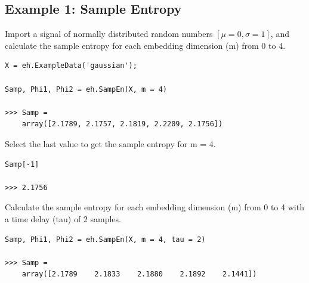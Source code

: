 \documentclass[12pt, a4paper, titlepage, openany]{book}
\begin{document}
\subsection{\normalsize Example 1: \hspace{15mm} Sample Entropy}
\noindent Import a signal of normally distributed random numbers $[\mu = 0, \sigma = 1]$, and calculate the sample entropy for each embedding dimension (m) from 0 to 4.
\begin{verbatim}
X = eh.ExampleData('gaussian');

Samp, Phi1, Phi2 = eh.SampEn(X, m = 4)

>>> Samp = 
    array([2.1789, 2.1757, 2.1819, 2.2209, 2.1756])
\end{verbatim}
Select the last value to get the sample entropy for m = 4.
\begin{verbatim}
Samp[-1]

>>> 2.1756
\end{verbatim}
Calculate the sample entropy for each embedding dimension (m) from 0 to 4 with a time delay (tau) of 2 samples.
\begin{verbatim}
Samp, Phi1, Phi2 = eh.SampEn(X, m = 4, tau = 2)

>>> Samp =
    array([2.1789    2.1833    2.1880    2.1892    2.1441])
\end{verbatim}



\newpage
\end{document}
